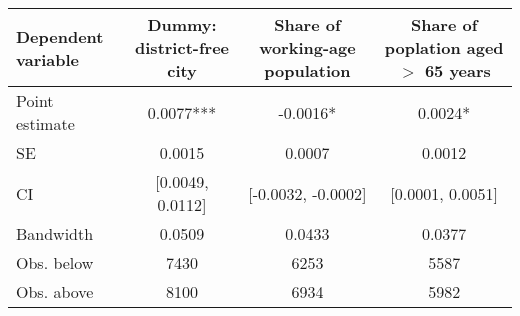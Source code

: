 \begin{tabular}{lccc}
  \toprule
 \midrule
Dependent variable & Dummy: district-free city & Share of working-age population & Share of poplation aged $>$ 65 years \\ 
  \midrule
Point estimate & 0.0077*** & -0.0016* & 0.0024* \\ 
  SE &  0.0015 &  0.0007 &  0.0012 \\ 
  CI & [0.0049, 0.0112] & [-0.0032, -0.0002] & [0.0001, 0.0051] \\ 
   \midrule
Bandwidth & 0.0509 & 0.0433 & 0.0377 \\ 
  Obs. below &  7430 &  6253 &  5587 \\ 
  Obs. above &  8100 &  6934 &  5982 \\ 
   \midrule
 \bottomrule
\end{tabular}
